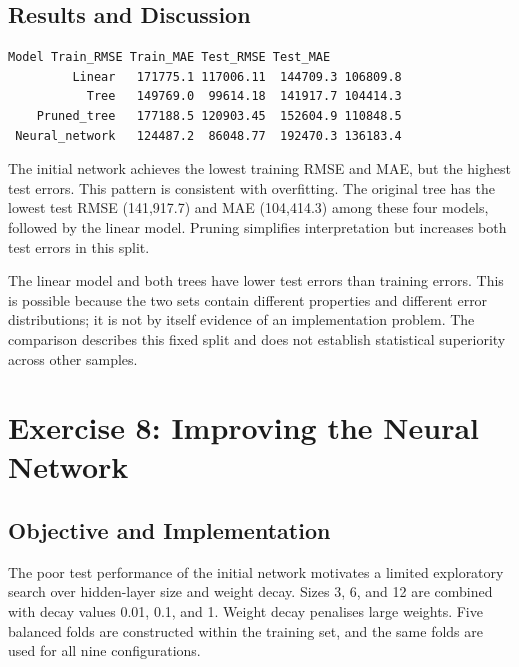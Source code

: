 \documentclass[11pt,a4paper]{article}
\begin{document}
\subsection{Results and Discussion}
\par\noindent\begin{minipage}{\linewidth}
\begin{lstlisting}[style=console]
Model Train_RMSE Train_MAE Test_RMSE Test_MAE
         Linear   171775.1 117006.11  144709.3 106809.8
           Tree   149769.0  99614.18  141917.7 104414.3
    Pruned_tree   177188.5 120903.45  152604.9 110848.5
 Neural_network   124487.2  86048.77  192470.3 136183.4
\end{lstlisting}
\end{minipage}\par
The initial network achieves the lowest training RMSE and MAE, but the highest test errors. This pattern is consistent with overfitting. The original tree has the lowest test RMSE (141,917.7) and MAE (104,414.3) among these four models, followed by the linear model. Pruning simplifies interpretation but increases both test errors in this split.

The linear model and both trees have lower test errors than training errors. This is possible because the two sets contain different properties and different error distributions; it is not by itself evidence of an implementation problem. The comparison describes this fixed split and does not establish statistical superiority across other samples.

\section{Exercise 8: Improving the Neural Network}
\subsection{Objective and Implementation}
The poor test performance of the initial network motivates a limited exploratory search over hidden-layer size and weight decay. Sizes 3, 6, and 12 are combined with decay values 0.01, 0.1, and 1. Weight decay penalises large weights. Five balanced folds are constructed within the training set, and the same folds are used for all nine configurations.
\end{document}
